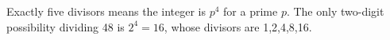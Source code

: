 Exactly five divisors means the integer is $p^4$ for a prime $p$. The only two-digit possibility dividing 48 is $2^4=\boxed{16}$, whose divisors are 1,2,4,8,16.
